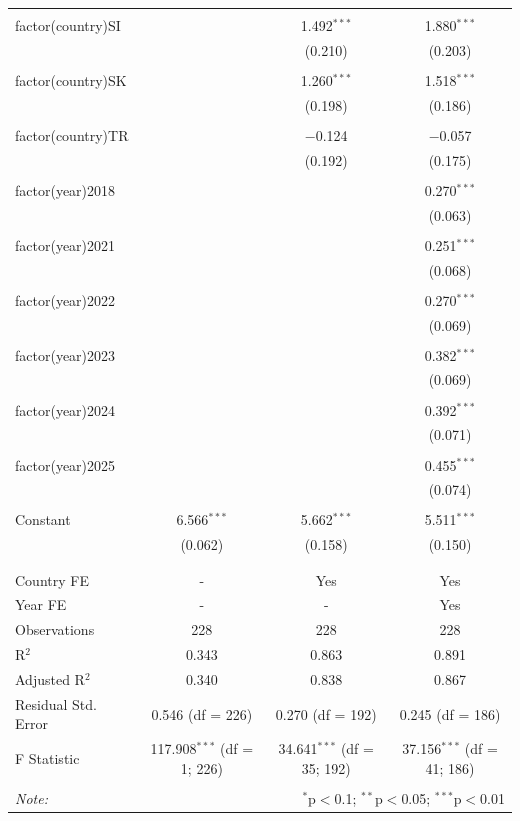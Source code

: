 \begin{table}[!htbp]
\begin{tabular}{@{\extracolsep{5pt}}lccc}
  & & & \\ 
 factor(country)SI &  & 1.492$^{***}$ & 1.880$^{***}$ \\ 
  &  & (0.210) & (0.203) \\ 
  & & & \\ 
 factor(country)SK &  & 1.260$^{***}$ & 1.518$^{***}$ \\ 
  &  & (0.198) & (0.186) \\ 
  & & & \\ 
 factor(country)TR &  & $-$0.124 & $-$0.057 \\ 
  &  & (0.192) & (0.175) \\ 
  & & & \\ 
 factor(year)2018 &  &  & 0.270$^{***}$ \\ 
  &  &  & (0.063) \\ 
  & & & \\ 
 factor(year)2021 &  &  & 0.251$^{***}$ \\ 
  &  &  & (0.068) \\ 
  & & & \\ 
 factor(year)2022 &  &  & 0.270$^{***}$ \\ 
  &  &  & (0.069) \\ 
  & & & \\ 
 factor(year)2023 &  &  & 0.382$^{***}$ \\ 
  &  &  & (0.069) \\ 
  & & & \\ 
 factor(year)2024 &  &  & 0.392$^{***}$ \\ 
  &  &  & (0.071) \\ 
  & & & \\ 
 factor(year)2025 &  &  & 0.455$^{***}$ \\ 
  &  &  & (0.074) \\ 
  & & & \\ 
 Constant & 6.566$^{***}$ & 5.662$^{***}$ & 5.511$^{***}$ \\ 
  & (0.062) & (0.158) & (0.150) \\ 
  & & & \\ 
\hline \\[-1.8ex] 
Country FE & - & Yes & Yes \\ 
Year FE & - & - & Yes \\ 
Observations & 228 & 228 & 228 \\ 
R$^{2}$ & 0.343 & 0.863 & 0.891 \\ 
Adjusted R$^{2}$ & 0.340 & 0.838 & 0.867 \\ 
Residual Std. Error & 0.546 (df = 226) & 0.270 (df = 192) & 0.245 (df = 186) \\ 
F Statistic & 117.908$^{***}$ (df = 1; 226) & 34.641$^{***}$ (df = 35; 192) & 37.156$^{***}$ (df = 41; 186) \\ 
\hline 
\hline \\[-1.8ex] 
\textit{Note:}  & \multicolumn{3}{r}{$^{*}$p$<$0.1; $^{**}$p$<$0.05; $^{***}$p$<$0.01} \\ 
\end{tabular} 
\end{table} 

